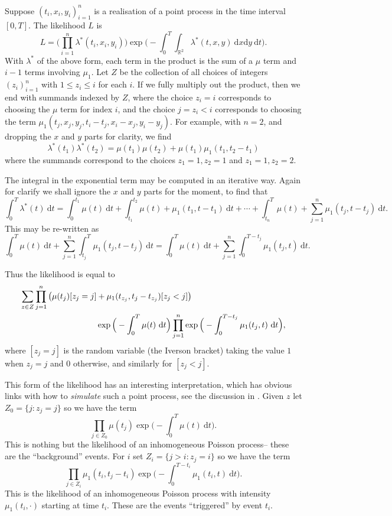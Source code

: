 \documentclass[twoside,a4paper]{article}
\theoremstyle{plain}
\theoremstyle{definition}
\newcommand{\rd}{\textrm{d}}
\begin{document}
Suppose $(t_i,x_i,y_i)_{i=1}^n$ is a realisation of a point process in the time interval
$[0,T]$.  The likelihood $L$ is
\[ L = \Big( \prod_{i=1}^n \lambda^*(t_i,x_i,y_i)\Big)
\exp\Big(-\int_0^T \int_{\mathbb R^2} \lambda^*(t,x,y) \ \rd x \rd y \ \rd t\Big). \]
With $\lambda^*$ of the above form, each term in the product is the sum of a $\mu$
term and $i-1$ terms involving $\mu_1$.  Let $Z$ be the collection of all choices of
integers $(z_i)_{i=1}^n$ with $1 \leq z_i \leq i$ for each $i$.  If we fully multiply out
the product, then we end with summands indexed by $Z$, where the choice $z_i=i$ corresponds
to choosing the $\mu$ term for index $i$, and the choice $j=z_i<i$ corresponds to choosing
the term $\mu_1(t_j,x_j,y_j,t_i-t_j,x_i-x_j,y_i-y_j)$.  For example, with $n=2$, and dropping
the $x$ and $y$ parts for clarity, we find
\[ \lambda^*(t_1)\lambda^*(t_2) = \mu(t_1)\mu(t_2) + \mu(t_1)\mu_1(t_1, t_2-t_1) \]
where the summands correspond to the choices $z_1=1,z_2=1$ and $z_1=1,z_2=2$.

The integral in the exponential term may be computed in an iterative way.  Again for
clarify we shall ignore the $x$ and $y$ parts for the moment, to find that
\[ \int_0^T \lambda^*(t) \ \rd t 
= \int_0^{t_1} \mu(t)  \ \rd t 
+ \int_{t_1}^{t_2} \mu(t) + \mu_1(t_1, t-t_1) \ \rd t
+ \cdots + \int_{t_n}^T \mu(t) + \sum_{j=1}^n \mu_1(t_j, t-t_j) \ \rd t. \]
This may be re-written as 
\[ \int_0^T \mu(t) \ \rd t + \sum_{j=1}^n \int_{t_j}^T \mu_1(t_j, t-t_j) \ \rd t
= \int_0^T \mu(t) \ \rd t + \sum_{j=1}^n \int_{0}^{T-t_j} \mu_1(t_j, t) \ \rd t. \]

Thus the likelihood is equal to
\begin{align}
\sum_{z\in Z} \prod_{j=1}^n \big( \mu(t_j)[z_j=j] &+ \mu_1(t_{z_j},t_j - t_{z_j}) [z_j<j] \big)
\notag \\ &
\exp\Big(-\int_0^T \mu(t) \ \rd t\Big) \prod_{j=1}^n\exp\Big(-\int_{0}^{T-t_j} \mu_1(t_j, t) \ \rd t\Big), \label{eq:one}
\end{align}
where $[z_j=j]$ is the random variable (the Iverson bracket) taking the value $1$ when
$z_j=j$ and $0$ otherwise, and similarly for $[z_j<j]$.

This form of the likelihood has an interesting interpretation, which has obvious links with how
to \emph{simulate} such a point process, see the discussion in \cite{mr, mr1}.
Given $z$ let $Z_0 = \{ j : z_j=j \}$ so we have the term
\[ \prod_{j\in Z_0} \mu(t_j) \exp\Big(-\int_0^T \mu(t) \ \rd t\Big). \]
This is nothing but the likelihood of an inhomogeneous Poisson process-- these are the
``background'' events.  For $i$ set $Z_i = \{ j > i : z_j=i \}$ so we have the term
\[ \prod_{j\in Z_i} \mu_1(t_i,t_j - t_i)\exp\Big(-\int_{0}^{T-t_i} \mu_1(t_i, t) \ \rd t\Big). \]
This is the likelihood of an inhomogeneous Poisson process with intensity $\mu_1(t_i,\cdot)$
starting at time $t_i$.  These are the events ``triggered'' by event $t_i$.
\end{document}
